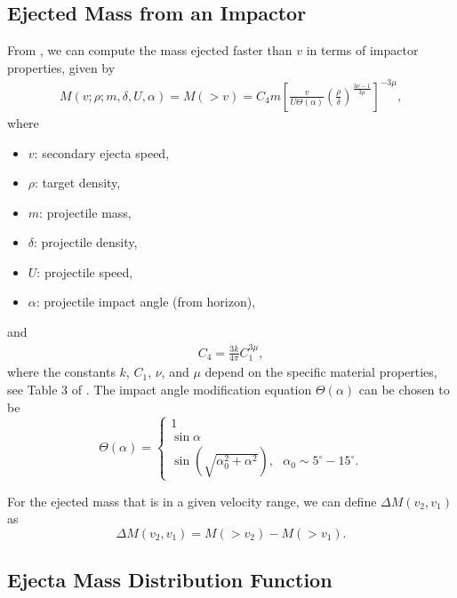 \documentclass{hitec}
\numberwithin{equation}{section}
\begin{document}
\subsection{Ejected Mass from an Impactor}\label{ssec:Ejected Mass from an Impactor}
From \cite{housen2011ejecta}, we can compute the mass ejected faster than $v$ in terms of impactor properties, given by
\begin{eqnarray}\label{eq:HH11_mass-ejected1}
M(v; \rho; m, \delta, U, \alpha) = M(>v) = C_4 m\left[\frac{v}{U\Theta(\alpha)}\left(\frac{\rho}{\delta}\right)^{\frac{3\nu-1}{3\mu}}\right]^{-3\mu},
\end{eqnarray}
where
\begin{itemize}
	\item $v$: secondary ejecta speed,
	\item $\rho$: target density,
	\item $m$: projectile mass,
	\item $\delta$: projectile density,
	\item $U$: projectile speed,
	\item $\alpha$: projectile impact angle (from horizon),
\end{itemize}
and
\begin{eqnarray}
C_4 = \frac{3k}{4\pi}C_1^{3\mu},
\end{eqnarray}
where the constants $k$, $C_1$, $\nu$, and $\mu$ depend on the specific material properties, see Table 3 of \cite{housen2011ejecta}. The impact angle modification equation $\Theta(\alpha)$ can be chosen to be
\begin{equation}
\Theta(\alpha) = \begin{cases}
1\\
\sin\alpha\\
\sin(\sqrt{\alpha_0^2 + \alpha^2}),\text{  } \alpha_0 \sim 5^\circ-15^\circ.
\end{cases}
\end{equation}

For the ejected mass that is in a given velocity range, we can define $\Delta M(v_2, v_1)$ as
\begin{equation}\label{eq:delta_M}
\Delta M(v_2, v_1) = M(>v_2) - M(>v_1).
\end{equation}

\subsection{Ejecta Mass Distribution Function}
\end{document}
